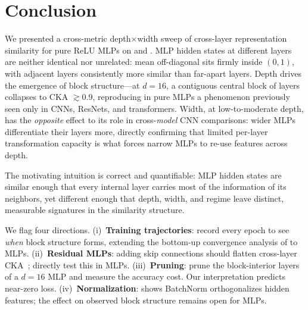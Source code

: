 \section{Conclusion}
\label{sec:conclusion}

We presented a cross-metric depth$\times$width sweep of cross-layer representation similarity for pure ReLU MLPs on \cifar and \mnist. MLP hidden states at different layers are neither identical nor unrelated: mean off-diagonal \ckam sits firmly inside $(0,1)$, with adjacent layers consistently more similar than far-apart layers. Depth drives the emergence of block structure---at $d\!=\!16$, a contiguous central block of layers collapses to CKA $\gtrsim 0.9$, reproducing in pure MLPs a phenomenon previously seen only in CNNs, ResNets, and transformers. Width, at low-to-moderate depth, has the \emph{opposite} effect to its role in cross-\emph{model} CNN comparisons: wider MLPs differentiate their layers more, directly confirming that limited per-layer transformation capacity is what forces narrow MLPs to re-use features across depth.

 The motivating intuition is correct and quantifiable: MLP hidden states are similar enough that every internal layer carries most of the information of its neighbors, yet different enough that depth, width, and regime leave distinct, measurable signatures in the similarity structure.

 We flag four directions. (i)~\textbf{Training trajectories}: record \ckam every epoch to see \emph{when} block structure forms, extending the bottom-up convergence analysis of \citet{raghu2017svcca} to MLPs. (ii)~\textbf{Residual MLPs}: adding skip connections should flatten cross-layer CKA~\citep{raghu2021vit}; directly test this in MLPs. (iii)~\textbf{Pruning}: prune the block-interior layers of a $d\!=\!16$ MLP and measure the accuracy cost. Our interpretation predicts near-zero loss. (iv)~\textbf{Normalization}: \citet{daneshmand2021bn} shows BatchNorm orthogonalizes hidden features; the effect on observed block structure remains open for MLPs.
